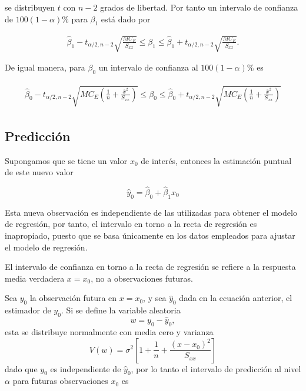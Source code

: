 \begin{itemize}
\begin{enumerate}
se distribuyen $t$ con $n-2$ grados de libertad. Por tanto un intervalo de confianza de $100\left(1-\alpha\right)\%$ para $\beta_{1}$ est\'a dado por

\begin{eqnarray}
\hat{\beta}_{1}-t_{\alpha/2,n-2}\sqrt{\frac{MC_{E}}{S_{xx}}}\leq \beta_{1}\leq\hat{\beta}_{1}+t_{\alpha/2,n-2}\sqrt{\frac{MC_{E}}{S_{xx}}}.
\end{eqnarray}

De igual manera, para $\beta_{0}$ un intervalo de confianza al $100\left(1-\alpha\right)\%$ es

\begin{eqnarray}
\begin{array}{l}
\hat{\beta}_{0}-t_{\alpha/2,n-2}\sqrt{MC_{E}\left(\frac{1}{n}+\frac{\overline{x}^{2}}{S_{xx}}\right)}\leq\beta_{0}\leq\hat{\beta}_{0}+t_{\alpha/2,n-2}\sqrt{MC_{E}\left(\frac{1}{n}+\frac{\overline{x}^{2}}{S_{xx}}\right)}
\end{array}
\end{eqnarray}
\subsection*{Predicci\'on}
Supongamos que se tiene un valor $x_{0}$ de inter\'es, entonces la estimaci\'on puntual de este nuevo valor

\begin{equation}
\hat{y}_{0}=\hat{\beta}_{0}+\hat{\beta}_{1}x_{0}
\end{equation}


Esta nueva observaci\'on es independiente de las utilizadas para obtener el modelo de regresi\'on, por tanto, el intervalo en torno a la recta de regresi\'on es inapropiado, puesto que se basa \'unicamente en los datos empleados para ajustar el modelo de regresi\'on.

El intervalo de confianza en torno a la recta de regresi\'on se refiere a la respuesta media verdadera $x=x_{0}$, no a observaciones futuras.

Sea $y_{0}$ la observaci\'on futura en $x=x_{0}$, y sea $\hat{y}_{0}$ dada en la ecuaci\'on anterior, el estimador de $y_{0}$. Si se define la variable aleatoria $$w=y_{0}-\hat{y}_{0},$$ esta se distribuye normalmente con media cero y varianza $$V\left(w\right)=\sigma^{2}\left[1+\frac{1}{n}+\frac{\left(x-x_{0}\right)^2}{S_{xx}}\right]$$
dado que $y_{0}$ es independiente de $\hat{y}_{0}$, por lo tanto el intervalo de predicci\'on al nivel $\alpha$ para futuras observaciones $x_{0}$ es



\end{enumerate}
\end{itemize}
